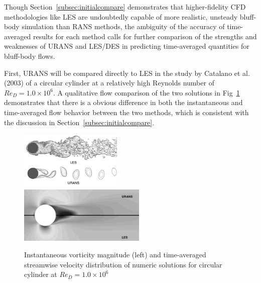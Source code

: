 \documentclass[journal]{new-aiaa}
\begin{document}
Though Section~\ref{subsec:initialcompare} demonstrates that higher-fidelity CFD methodologies like LES are undoubtedly capable of more realistic, unsteady bluff-body simulation than RANS methods, the ambiguity of the accuracy of time-averaged results for each method calls for further comparison of the strengths and weaknesses of URANS and LES/DES in predicting time-averaged quantities for bluff-body flows.

First, URANS will be compared directly to LES in the study by Catalano et al. (2003) \cite{catalano2003numerical} of a circular cylinder at a relatively high Reynolds number of $Re_D = 1.0 \times 10^6$. A qualitative flow comparison of the two solutions in Fig~\ref{fig:cylinderransvslesflow} demonstrates that there is a obvious difference in both the instantaneous and time-averaged flow behavior between the two methods, which is consistent with the discussion in Section~\ref{subsec:initialcompare}.



\begin{figure}[H]
\begin{center}
\includegraphics[width=0.45\textwidth]{Images/logan/catalano_2003numerical_UnsteadyURANSvsLES.pdf}
\includegraphics[width=0.54\textwidth]{Images/logan/catalano_2003numerical_SteadyURANSvsLES.pdf}
\caption{ Instantaneous vorticity magnitude (left) and time-averaged streamwise velocity distribution of numeric solutions for circular cylinder at $Re_D = 1.0 \times 10^6$ \cite{catalano2003numerical} }
\label{fig:cylinderransvslesflow}
\end{center}
\end{figure}
\end{document}
